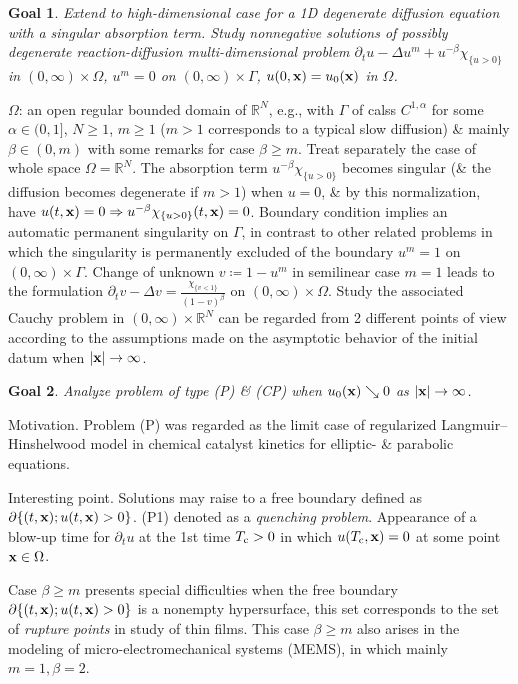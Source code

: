 \documentclass{article}
\newtheorem{goal}{Goal}
\begin{document}
\begin{enumerate}
	\begin{goal}
		Extend to high-dimensional case \cite{Kawohl_Kersner1992} for a 1D degenerate diffusion equation with a singular absorption term. Study nonnegative solutions of possibly degenerate reaction-diffusion multi-dimensional problem $\partial_tu - \Delta u^m + u^{-\beta}\chi_{\{u > 0\}}$ in $(0,\infty)\times\Omega$, $u^m = 0$ on $(0,\infty)\times\Gamma$, $u(0,{\bf x}) = u_0({\bf x})$ in $\Omega$.
	\end{goal}
	$\Omega$: an open regular bounded domain of $\mathbb{R}^N$, e.g., with $\Gamma$ of calss $C^{1,\alpha}$ for some $\alpha\in(0,1]$, $N\ge1$, $m\ge 1$ ($m > 1$ corresponds to a typical slow diffusion) \& mainly $\beta\in(0,m)$ with some remarks for case $\beta\ge m$. Treat separately the case of whole space $\Omega = \mathbb{R}^N$. The absorption term $u^{-\beta}\chi_{\{u > 0\}}$ becomes singular (\& the diffusion becomes degenerate if $m > 1$) when $u = 0$, \& by this normalization, have $u(t,{\bf x}) = 0\Rightarrow u^{-\beta}\chi_{\{u > 0\}}(t,{\bf x}) = 0$. Boundary condition implies an automatic permanent singularity on $\Gamma$, in contrast to other related problems in which the singularity is permanently excluded of the boundary $u^m = 1$ on $(0,\infty)\times\Gamma$.  Change of unknown $v\coloneqq1 - u^m$ in semilinear case $m = 1$ leads to the formulation $\partial_tv - \Delta v = \frac{\chi_{\{v < 1\}}}{(1 - v)^\beta}$ on $(0,\infty)\times\Omega$. Study the associated Cauchy problem in $(0,\infty)\times\mathbb{R}^N$ can be regarded from 2 different points of view according to the assumptions made on the asymptotic behavior of the initial datum when $|{\bf x}|\to\infty$.	
	\begin{goal}
		Analyze problem of type (P) \& (CP) when $u_0({\bf x})\searrow0$ as $|{\bf x}|\to\infty$.
	\end{goal}
	{\sf Motivation.} Problem (P) was regarded as the limit case of regularized Langmuir--Hinshelwood model in chemical catalyst kinetics for elliptic- \& parabolic equations.
	
	{\sf Interesting point.} Solutions may raise to a free boundary defined as $\partial\{(t,{\bf x});u(t,{\bf x}) > 0\}$. (P1) denoted as a {\it quenching problem}. Appearance of a blow-up time for $\partial_tu$ at the 1st time $T_{\rm c} > 0$ in which $u(T_{\rm c},{\bf x}) = 0$ at some point ${\bf x}\in\Omega$.
	
	Case $\beta\ge m$ presents special difficulties when the free boundary $\partial\{(t,{\bf x});u(t,{\bf x}) > 0\}$ is a nonempty hypersurface, this set corresponds to the set of {\it rupture points} in study of thin films. This case $\beta\ge m$ also arises in the modeling of micro-electromechanical systems (MEMS), in which mainly $m = 1,\beta = 2$.
	

\end{enumerate}
\end{document}
